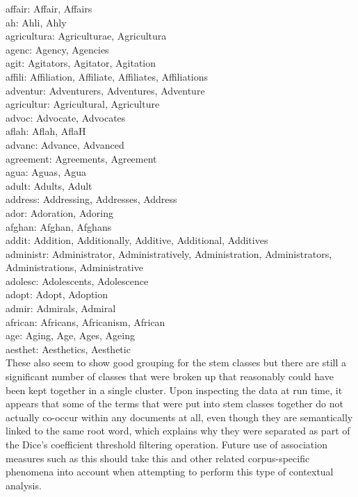 \noindent
affair: Affair, Affairs\\
ah: Ahli, Ahly\\
agricultura: Agriculturae, Agricultura\\
agenc: Agency, Agencies\\
agit: Agitators, Agitator, Agitation\\
affili: Affiliation, Affiliate, Affiliates, Affiliations\\
adventur: Adventurers, Adventures, Adventure\\
agricultur: Agricultural, Agriculture\\
advoc: Advocate, Advocates\\
aflah: Aflah, AflaH\\
advanc: Advance, Advanced\\
agreement: Agreements, Agreement\\
agua: Aguas, Agua\\
adult: Adults, Adult\\
address: Addressing, Addresses, Address\\
ador: Adoration, Adoring\\
afghan: Afghan, Afghans\\
addit: Addition, Additionally, Additive, Additional, Additives\\
administr: Administrator, Administratively, Administration, Administrators, Administrations, Administrative\\
adolesc: Adolescents, Adolescence\\
adopt: Adopt, Adoption\\
admir: Admirals, Admiral\\
african: Africans, Africanism, African\\
age: Aging, Age, Ages, Ageing\\
aesthet: Aesthetics, Aesthetic\\

These also seem to show good grouping for the stem classes but there are still a significant number of classes that were broken up that reasonably could have been kept together in a single cluster.  Upon inspecting the data at run time, it appears that some of the terms that were put into stem classes together do not actually co-occur within any documents at all, even though they are semantically linked to the same root word, which explains why they were separated as part of the Dice's coefficient threshold filtering operation.  Future use of association measures such as this should take this and other related corpus-specific phenomena into account when attempting to perform this type of contextual analysis.